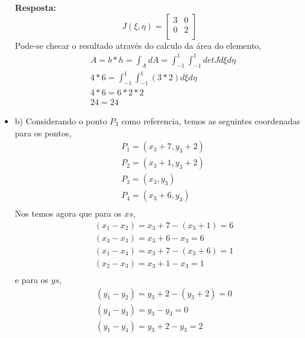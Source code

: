 \begin{itemize}
	\color{blue}
	\textbf{Resposta:}
	\begin{equation}
	J(\xi, \eta) = 
	\begin{bmatrix}
		3 & 0\\
		0 & 2\\
	\end{bmatrix}
	\end{equation}	
	\color{black}
	Pode-se checar o resultado através do calculo da área do elemento,
	\begin{equation}
		\begin{split}
		& A = b * h = \int_A dA = \int_{-1}^1 \int_{-1}^1 det J d\xi d\eta\\
		& 4 * 6 = \int_{-1}^1 \int_{-1}^1 \left(3 * 2\right)  d\xi d\eta\\
		& 4 * 6 = 6 * 2 * 2 \\
		& 24 = 24		
		\end{split}
	\end{equation}
	\item b)
	Considerando o ponto $P_3$ como referencia, temos as seguintes coordenadas para os pontos,
	\begin{equation}
		\begin{split}
		&	P_1 = (x_3 + 7, y_3 + 2)\\
		&	P_2 = (x_3 + 1, y_3 + 2)\\
		&	P_3 = (x_3    , y_3    )\\
		&	P_4 = (x_3 + 6, y_3    )\\
		\end{split}
	\end{equation}
	Nos temos agora que para os $xs$,
	\begin{equation}
	\begin{split}
		&	(x_1 - x_2) = x_3 + 7 - (x_3 + 1) = 6 \\
		&	(x_4 - x_3) = x_3 + 6 - x_3 = 6\\
		&	(x_1 - x_4) = x_3 + 7 - (x_3 + 6) = 1\\\
		&	(x_2 - x_3) = x_3 + 1 - x_3 = 1\\
	\end{split}
	\end{equation}
	e para os $ys$,
	\begin{equation}
	\begin{split}
		&	(y_1 - y_2) = y_3 + 2 - (y_3 + 2) = 0 \\
		&	(y_4 - y_3) = y_3 - y_3 = 0\\
		&	(y_1 - y_4) = y_3 + 2 - y_3 = 2\\\

\end{split}
\end{equation}
\end{itemize}

